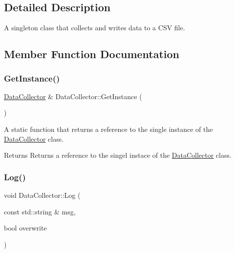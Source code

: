 \subsection{Detailed Description}
A singleton class that collects and writes data to a C\+SV file. 

\subsection{Member Function Documentation}
\mbox{\label{classDataCollector_aa1cf25c127a7261ccaae4fac0fc5645b}} 
\subsubsection{\texorpdfstring{Get\+Instance()}{GetInstance()}}
{\footnotesize\ttfamily \hyperlink{classDataCollector}{Data\+Collector} \& Data\+Collector\+::\+Get\+Instance (\begin{DoxyParamCaption}{ }\end{DoxyParamCaption})\hspace{0.3cm}{\ttfamily [static]}}



A static function that returns a reference to the single instance of the \hyperlink{classDataCollector}{Data\+Collector} class. 

\begin{DoxyReturn}{Returns}
Returns a reference to the singel instace of the \hyperlink{classDataCollector}{Data\+Collector} class. 
\end{DoxyReturn}
\mbox{\label{classDataCollector_af7d41172cc49dfb689ba91cf2171a5e8}} 
\subsubsection{\texorpdfstring{Log()}{Log()}}
{\footnotesize\ttfamily void Data\+Collector\+::\+Log (\begin{DoxyParamCaption}\item[{const std\+::string \&}]{msg,  }\item[{bool}]{overwrite }\end{DoxyParamCaption})}



